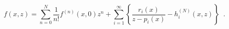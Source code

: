 \begin{equation}
f(x,z)=
\sum_{n=0}^N \frac{1}{n!}f^{(n)}(x,0)z^n +
\sum_{i=1}^{\infty}
\left\{
\frac{r_i(x)}{z-p_i(x)} - h^{(N)}_i(x,z)
\right\} \;\; .
\label{1.18}
\end{equation}

